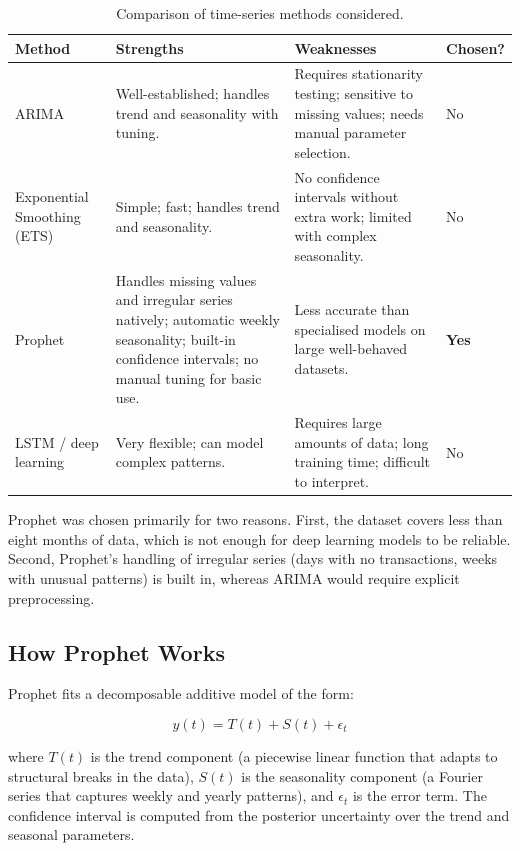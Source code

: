 \documentclass[12pt, a4paper]{report}
\begin{document}
\begin{table}[H]
  \centering
  \caption{Comparison of time-series methods considered.\label{tab:method_compare}}
  \begin{tabular}{p{2.5cm} p{4cm} p{4cm} p{2cm}}
    \toprule
    \textbf{Method} & \textbf{Strengths} & \textbf{Weaknesses} & \textbf{Chosen?} \\
    \midrule
    ARIMA
      & Well-established; handles trend and seasonality with tuning.
      & Requires stationarity testing; sensitive to missing values; needs manual
        parameter selection.
      & No \\[4pt]
    Exponential Smoothing (ETS)
      & Simple; fast; handles trend and seasonality.
      & No confidence intervals without extra work; limited with complex seasonality.
      & No \\[4pt]
    Prophet
      & Handles missing values and irregular series natively; automatic weekly
        seasonality; built-in confidence intervals; no manual tuning for basic use.
      & Less accurate than specialised models on large well-behaved datasets.
      & \textbf{Yes} \\[4pt]
    LSTM / deep learning
      & Very flexible; can model complex patterns.
      & Requires large amounts of data; long training time; difficult to interpret.
      & No \\
    \bottomrule
  \end{tabular}
\end{table}

Prophet was chosen primarily for two reasons. First, the dataset covers less than
eight months of data, which is not enough for deep learning models to be reliable. Second,
Prophet's handling of irregular series (days with no transactions, weeks with unusual
patterns) is built in, whereas ARIMA would require explicit preprocessing.

\subsection{How Prophet Works}

Prophet fits a decomposable additive model of the form:

\[
  y(t) = T(t) + S(t) + \epsilon_t
\]

where $T(t)$ is the trend component (a piecewise linear function that adapts to
structural breaks in the data), $S(t)$ is the seasonality component (a Fourier
series that captures weekly and yearly patterns), and $\epsilon_t$ is the error
term. The confidence interval is computed from the posterior uncertainty over the
trend and seasonal parameters.
\end{document}
